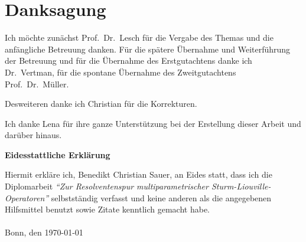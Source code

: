 \documentclass[paper=a4,twoside,parskip=full,bibliography=totoc]{scrartcl}
\numberwithin{equation}{section}
\numberwithin{Corollary}{section}
\numberwithin{Lemma}{section}
\numberwithin{Theorem}{section}
\newcommand{\EmptyPage}{\thispagestyle{empty}\mbox{}\newpage}
\newcommand{\Thema}{Zur Resolventenspur multiparametrischer
Sturm-Liouville-Operatoren}
\begin{document}
\section*{Danksagung}
{\large
Ich möchte zunächst Prof.~Dr.~Lesch für die Vergabe des Themas und die
anfängliche Betreuung danken. Für die spätere Übernahme und Weiterführung der
Betreuung und für die Übernahme des Erstgutachtens danke ich Dr.~Vertman, für
die spontane Übernahme des Zweitgutachtens Prof.~Dr.~Müller.

Desweiteren danke ich Christian für die Korrekturen.

Ich danke Lena für ihre ganze Unterstützung bei der Erstellung dieser Arbeit und
darüber hinaus.
}
\newpage
\EmptyPage
{}
\setcounter{page}{1}
\tableofcontents
\newpage
{}
\EmptyPage











\newpage
\appendix


\newpage

\newpage
\EmptyPage
{}
\thispagestyle{plain}
\begin{center}
    \textbf{\large Eidesstattliche Erklärung}
\end{center}
\vspace{2cm}
Hiermit erkläre ich, Benedikt Christian Sauer, an Eides statt, dass ich die
Diplomarbeit \textit{"`\Thema"'} selbstständig verfasst und keine anderen als
die angegebenen Hilfsmittel benutzt sowie Zitate kenntlich gemacht habe. \\
\vspace{2cm} \\
Bonn, den \today
\end{document}

